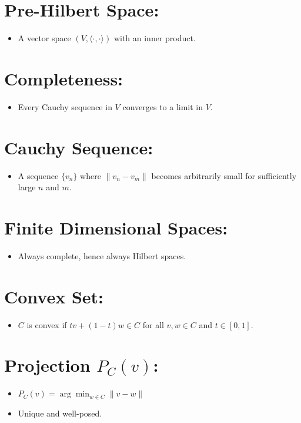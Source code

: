 \documentclass{article}
\begin{document}
\section{Pre-Hilbert Space:}
\begin{itemize}
    \item A vector space $(V, \langle \cdot, \cdot \rangle)$ with an inner product.
\end{itemize}

\section{Completeness:}
\begin{itemize}
    \item Every Cauchy sequence in $V$ converges to a limit in $V$.
\end{itemize}

\section{Cauchy Sequence:}
\begin{itemize}
    \item A sequence $\{v_n\}$ where $\|v_n - v_m\|$ becomes arbitrarily small for sufficiently large $n$ and $m$.
\end{itemize}

\section{Finite Dimensional Spaces:}
\begin{itemize}
    \item Always complete, hence always Hilbert spaces.
\end{itemize}

\section{Convex Set:}
\begin{itemize}
    \item $C$ is convex if $tv + (1 - t)w \in C$ for all $v, w \in C$ and $t \in [0, 1]$.
\end{itemize}

\section{Projection $P_C(v)$:}
\begin{itemize}
    \item $P_C(v) = \arg \min_{w \in C} \|v - w\|$
    \item Unique and well-posed.
\end{itemize}
\end{document}
